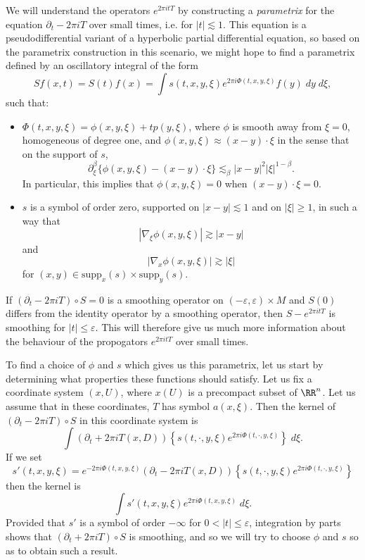 We will understand the operators $e^{2 \pi i t T}$ by constructing a \emph{parametrix} for the equation $\partial_t - 2 \pi i T$ over small times, i.e. for $|t| \lesssim 1$. This equation is a pseudodifferential variant of a hyperbolic partial differential equation, so based on the parametrix construction in this scenario, we might hope to find a parametrix defined by an oscillatory integral of the form
%
\[ Sf(x,t) = S(t)f(x) = \int s(t,x,y,\xi) e^{2 \pi i \Phi(t,x,y,\xi)} f(y)\; dy\; d\xi, \]
%
such that:
%
\begin{itemize}
    \item $\Phi(t,x,y,\xi) = \phi(x,y,\xi) + t p(y,\xi)$, where $\phi$ is smooth away from $\xi = 0$, homogeneous of degree one, and $\phi(x,y,\xi) \approx (x - y) \cdot \xi$ in the sense that on the support of $s$,
    \[ \partial^\beta_\xi \{ \phi(x,y,\xi) - (x - y) \cdot \xi \} \lesssim_\beta |x - y|^2 |\xi|^{1 - \beta}. \]
    In particular, this implies that $\phi(x,y,\xi) = 0$ when $(x - y) \cdot \xi = 0$.

    \item $s$ is a symbol of order zero, supported on $|x - y| \lesssim 1$ and on $|\xi| \geq 1$, in such a way that
    \[ |\nabla_\xi \phi(x,y,\xi)| \gtrsim |x - y| \]
    and
    \[ |\nabla_x \phi(x,y,\xi)| \gtrsim |\xi| \]
    for $(x,y) \in \text{supp}_x(s) \times \text{supp}_y(s)$.
\end{itemize}
%
If $(\partial_t - 2 \pi i T) \circ S = 0$ is a smoothing operator on $(-\varepsilon,\varepsilon) \times M$ and $S(0)$ differs from the identity operator by a smoothing operator, then $S - e^{2 \pi i t T}$ is smoothing for $|t| \leq \varepsilon$. This will therefore give us much more information about the behaviour of the propogators $e^{2 \pi i t T}$ over small times.

To find a choice of $\phi$ and $s$ which gives us this parametrix, let us start by determining what properties these functions should satisfy. Let us fix a coordinate system $(x,U)$, where $x(U)$ is a precompact subset of $\RR^n$. Let us assume that in these coordinates, $T$ has symbol $a(x,\xi)$. Then the kernel of $(\partial_t - 2 \pi i T) \circ S$ in this coordinate system is
%
\[ \int (\partial_t + 2 \pi i T(x,D)) \left\{ s(t,\cdot,y,\xi) e^{2 \pi i \Phi(t,\cdot,y,\xi)} \right\}\; d\xi. \]
%
If we set
%
\[ s'(t,x,y,\xi) = e^{- 2 \pi i \Phi(t,x,y,\xi)} (\partial_t - 2 \pi i T(x,D)) \left\{ s(t,\cdot,y,\xi) e^{2 \pi i \Phi(t,\cdot,y,\xi)} \right\} \]
%
then the kernel is
%
\[ \int s'(t,x,y,\xi) e^{2 \pi i \Phi(t,x,y,\xi)}\; d\xi. \]
%
Provided that $s'$ is a symbol of order $-\infty$ for $0 < |t| \leq \varepsilon$, integration by parts shows that $(\partial_t + 2 \pi i T) \circ S$ is smoothing, and so we will try to choose $\phi$ and $s$ so as to obtain such a result.

